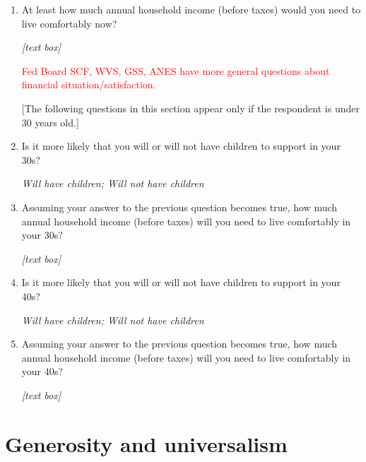 \documentclass[11pt, headsepline]{article}
\newcommand{\red}[1]{\textcolor{red}{#1}}
\begin{document}
\begin{enumerate}[resume]
    \item At least how much annual household income (before taxes) would you need to live comfortably now?

    \textit{[text box]}

    \red{Fed Board SCF, WVS, GSS, ANES have more general questions about financial situation/satisfaction.}

    [The following questions in this section appear only if the respondent is under 30 years old.]
    
    \item Is it more likely that you will or  will not have children to support in your 30s?

    \textit{Will have children; Will not have children}

    \item Assuming your answer to the previous question becomes true, how much annual household income (before taxes) will you need to live comfortably in your 30s?

    \textit{[text box]}

    \item Is it more likely that you will or will not have children to support in your 40s?

    \textit{Will have children; Will not have children}

    \item Assuming your answer to the previous question becomes true, how much annual household income (before taxes) will you need to live comfortably in your 40s?

    \textit{[text box]}
    
\end{enumerate}

\section*{Generosity and universalism}
\end{document}
